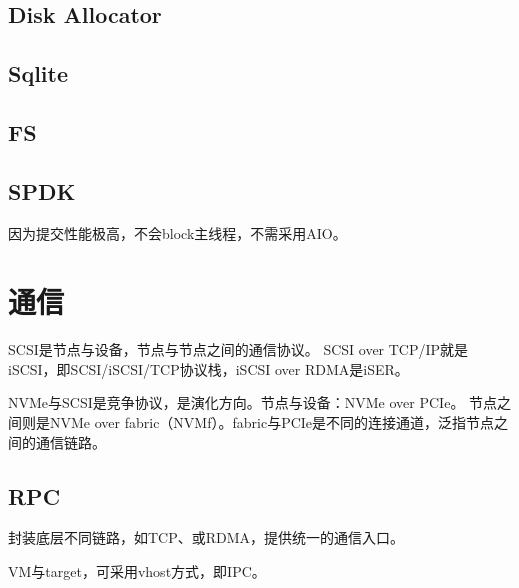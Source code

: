 \subsection{Disk Allocator}

\subsection{Sqlite}

\subsection{FS}

\subsection{SPDK}

因为提交性能极高，不会block主线程，不需采用AIO。

\section{通信}

SCSI是节点与设备，节点与节点之间的通信协议。
SCSI over TCP/IP就是iSCSI，即SCSI/iSCSI/TCP协议栈，iSCSI over RDMA是iSER。

NVMe与SCSI是竞争协议，是演化方向。节点与设备：NVMe over PCIe。
节点之间则是NVMe over fabric（NVMf）。fabric与PCIe是不同的连接通道，泛指节点之间的通信链路。

\subsection{RPC}

封装底层不同链路，如TCP、或RDMA，提供统一的通信入口。

VM与target，可采用vhost方式，即IPC。
